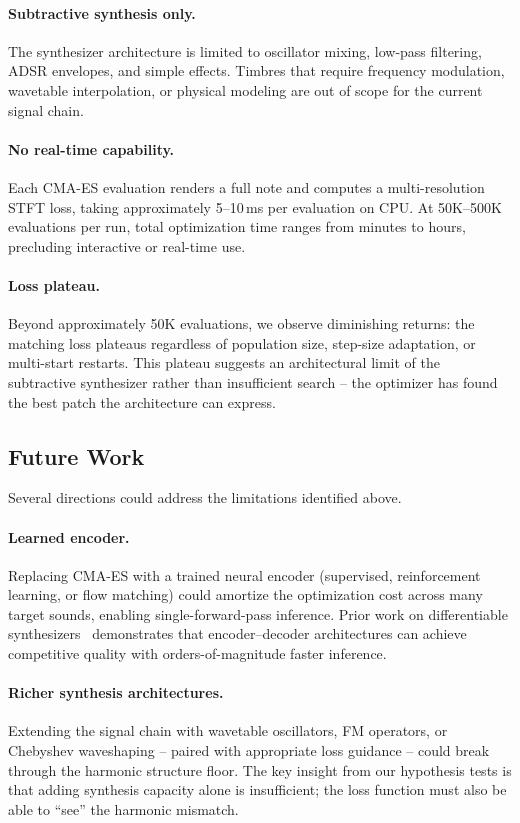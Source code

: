 \paragraph{Subtractive synthesis only.}
The synthesizer architecture is limited to oscillator mixing, low-pass filtering, ADSR envelopes, and simple effects.
Timbres that require frequency modulation, wavetable interpolation, or physical modeling are out of scope for the current signal chain.

\paragraph{No real-time capability.}
Each CMA-ES evaluation renders a full note and computes a multi-resolution STFT loss, taking approximately 5--10\,ms per evaluation on CPU.
At 50K--500K evaluations per run, total optimization time ranges from minutes to hours, precluding interactive or real-time use.

\paragraph{Loss plateau.}
Beyond approximately 50K evaluations, we observe diminishing returns: the matching loss plateaus regardless of population size, step-size adaptation, or multi-start restarts.
This plateau suggests an architectural limit of the subtractive synthesizer rather than insufficient search -- the optimizer has found the best patch the architecture can express.

\subsection{Future Work}

Several directions could address the limitations identified above.

\paragraph{Learned encoder.}
Replacing CMA-ES with a trained neural encoder (supervised, reinforcement learning, or flow matching) could amortize the optimization cost across many target sounds, enabling single-forward-pass inference.
Prior work on differentiable synthesizers~\cite{engel2020ddsp, masuda2023improving} demonstrates that encoder--decoder architectures can achieve competitive quality with orders-of-magnitude faster inference.

\paragraph{Richer synthesis architectures.}
Extending the signal chain with wavetable oscillators, FM operators, or Chebyshev waveshaping -- paired with appropriate loss guidance -- could break through the harmonic structure floor.
The key insight from our hypothesis tests is that adding synthesis capacity alone is insufficient; the loss function must also be able to ``see'' the harmonic mismatch.

